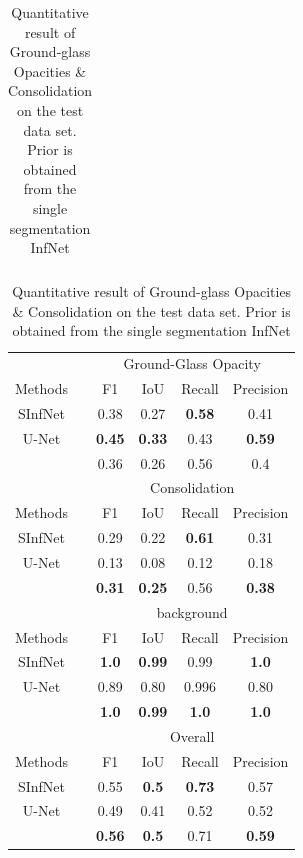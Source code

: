 \begin{table}[!h]
\begin{tabular}{| c | c || c c c c || c c c c |}
	\end{tabular}
	\caption{Quantitative result of Ground-glass Opacities \& Consolidation on the test data set. Prior is obtained from the single segmentation InfNet}
	\label{tab:multi-weakprior}
\end{table}

\begin{table}[!h]
	\centering
	
	\begin{tabular}{| c | c ||  c c c c |}
		\hline
		& &\multicolumn{4}{c|}{Ground-Glass Opacity }\\ \cline{3-6}
		Methods & & F1 & IoU & Recall & Precision \\\hline
		SInfNet &  & 0.38 & 0.27 & \textbf{0.58} & 0.41 \\ \hline
		U-Net & & \textbf{0.45} &\textbf{0.33} & 0.43 & \textbf{0.59} \\ \hline \hline
		\textcolor{blue}{\vtop{\hbox{\strut SSInfNet}\hbox{\strut }}} &  & 0.36 &0.26 & 0.56 & 0.4 \\ \hline \hline \hline
		
		
		& & \multicolumn{4}{c|}{Consolidation}\\ \cline{3-6}
		Methods & & F1 & IoU & Recall & Precision \\ \hline 
		SInfNet &  & 0.29 & 0.22 & \textbf{0.61} & 0.31  \\ \hline
		U-Net & & 0.13 & 0.08 & 0.12 & 0.18 \\ \hline \hline
		\textcolor{blue}{\vtop{\hbox{\strut SSInfNet}\hbox{\strut }}} &  & \textbf{0.31} & \textbf{0.25} & 0.56 & \textbf{0.38} \\ \hline \hline \hline
		
		
		& & \multicolumn{4}{c|}{background}\\ \cline{3-6}
		Methods & & F1 & IoU & Recall & Precision \\ \hline 
		SInfNet &  & \textbf{1.0} & \textbf{0.99}  & 0.99 & \textbf{1.0} \\ \hline
		U-Net & & 0.89 & 0.80 & 0.996 & 0.80 \\ \hline \hline
		\textcolor{blue}{\vtop{\hbox{\strut SSInfNet}\hbox{\strut }}} &  &  \textbf{1.0} & \textbf{0.99} & \textbf{1.0} & \textbf{1.0} \\ \hline \hline \hline
		
		
		& &\multicolumn{4}{c|}{Overall}\\ \cline{3-6}
		Methods & & F1 & IoU & Recall & Precision \\\hline
		SInfNet &  & 0.55 & \textbf{0.5} & \textbf{0.73} & 0.57   \\ \hline
		U-Net & & 0.49 & 0.41 & 0.52 & 0.52 \\ \hline \hline
		\textcolor{blue}{\vtop{\hbox{\strut SSInfNet}\hbox{\strut }}} &  & \textbf{0.56} & \textbf{0.5} & 0.71 & \textbf{0.59}  \\ \hline
		
		
	\end{tabular}
	\caption{Quantitative result of Ground-glass Opacities \& Consolidation on the test data set. Prior is obtained from the single segmentation InfNet}
	\label{tab:multi-weakprior}
\end{table}
